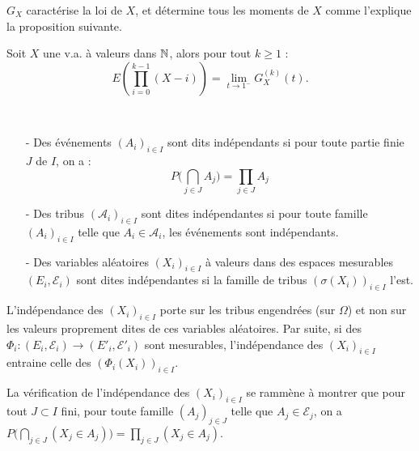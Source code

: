 \documentclass[11pt,a4paper]{article}
\begin{document}
\begin{rmq}
$G_X$ caractérise la loi de $X$, et détermine tous les moments de $X$ comme l'explique la proposition suivante.
\end{rmq}

\begin{propstar}
Soit $X$ une v.a. à valeurs dans $\mathbb N$, alors pour tout $k\geq 1$ :\[E\left(\prod_{i=0}^{k-1}(X-i)\right) = \lim_{t\to 1^-}G_X^{(k)}(t).\]
\end{propstar}

\begin{definstar}[Indépendance]~
\begin{itemize}
\item[-] Des événements $(A_i)_{i\in I}$  sont dits indépendants si pour toute partie finie $J$ de $I$, on a : \[P\Big(\bigcap_{j\in J}A_j\Big)=\prod_{j\in J}A_j\]
\item[-] Des tribus  $(\mathcal{A}_i)_{i\in I}$  sont dites indépendantes si pour toute famille $(A_i)_{i\in I}$ telle que $A_i\in \mathcal{A}_i$, les événements sont indépendants.
\item[-] Des variables aléatoires $(X_i)_{i\in I}$  à valeurs dans des espaces mesurables $(E_i,\mathcal{E}_i)$ sont dites indépendantes si la famille de tribus $(\sigma(X_i))_{i\in I}$ l'est.
\end{itemize}
\end{definstar}

\begin{rmq}
L'indépendance des $(X_i)_{i\in I}$ porte sur les tribus engendrées (sur $\Omega$) et non sur les
valeurs proprement dites de ces variables aléatoires. Par suite, si des $\Phi_i : (E_i,\mathcal{E}_i) \to (E'_i,\mathcal{E}'_i)$ sont mesurables, l'indépendance des $(X_i)_{i\in I}$ entraine celle des $(\Phi_i(X_i))_{i\in I}$.
\end{rmq}

\begin{rmq}
La vérification de l'indépendance des $(X_i)_{i\in I}$ se rammène à montrer que pour tout $J\subset I$ fini, pour toute famille $(A_j)_{j\in J}$ telle que $A_j\in \mathcal{E}_j$, on a $\displaystyle P\Big(\bigcap_{j\in J}(X_j\in A_j )\Big)=\prod_{j\in J}(X_j \in A_j)$.
\end{rmq}
\end{document}
